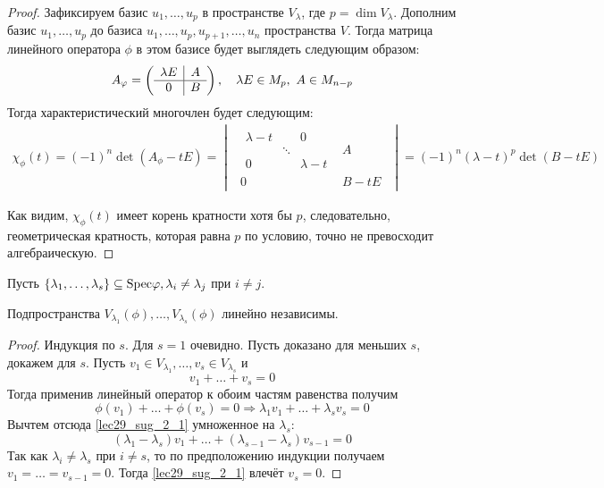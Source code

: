 \begin{proof}
  Зафиксируем базис $u_1, \ldots, u_p$ в пространстве $V_\lambda$, где $p = \dim{V_\lambda}$. Дополним базис $u_1, \ldots, u_p$ до базиса $u_1, \ldots, u_p, u_{p+1}, \ldots, u_n$ пространства $V$. Тогда матрица линейного оператора $\phi$ в 
  этом базисе будет выглядеть следующим образом:
  \begin{gather*}
    A_\phi = 
    \begin{pmatrix*}
      \begin{array}{c|c}
        \l E & A \\ \hline
        0 & B
      \end{array}
    \end{pmatrix*}, \quad \lambda E \in M_p,\ A \in M_{n-p}
  \end{gather*}
  Тогда характеристический многочлен будет следующим:
  \begin{gather*}
    \chi_\phi(t) = (-1)^n \det (A_\phi - tE) = 
    \begin{vmatrix}
      \begin{array}{c|c}
	\begin{matrix}
          \lambda - t &  & 0 \\
          & \ddots &  \\
          0 &  & \lambda - t
	\end{matrix}
          & A \\ \hline
	0 & B - tE
      \end{array}
    \end{vmatrix}
    = (-1)^n(\lambda - t)^p\det(B - tE)
  \end{gather*}

  Как видим, $\chi_\phi(t)$ имеет корень кратности хотя бы $p$, следовательно, геометрическая кратность, которая равна $p$ по условию, точно не превосходит алгебраическую.
\end{proof}

Пусть $\{\lambda_1, \ldots, \lambda_s\} \subseteq \mathrm{Spec} \varphi, \lambda_i \ne \lambda_j$ при $i \ne j$.

\begin{Suggestion}
  Подпространства $V_{\lambda_1}(\phi), \ldots, V_{\lambda_s}(\phi)$ линейно независимы.
\end{Suggestion}

\begin{proof}
  Индукция по $s$. Для $s = 1$ очевидно. Пусть доказано для меньших $s$, докажем для $s$. Пусть $v_1 \in V_{\lambda_1}, \ldots, v_s \in V_{\lambda_s}$ и
  \[
    \tag{$\star$}
    v_1 + \ldots + v_s = 0 \label{lec29_sug_2_1}
  \]
  Тогда применив линейный оператор к обоим частям равенства получим
  \[
    \phi(v_1) + \ldots + \phi(v_s) = 0 \Rightarrow \lambda_1 v_1 + \ldots + \lambda_s v_s = 0
  \]
  Вычтем отсюда \eqref{lec29_sug_2_1} умноженное на $\lambda_s$:
  \[
    (\lambda_1 - \lambda_s)v_1 + \ldots + (\lambda_{s - 1} - \lambda_s)v_{s - 1} = 0
  \]
  Так как $\lambda_i \ne \lambda_s$ при $i \ne s$, то по предположению индукции получаем $v_1 = \ldots = v_{s - 1} = 0$. Тогда \eqref{lec29_sug_2_1} влечёт $v_s = 0$.
\end{proof}

